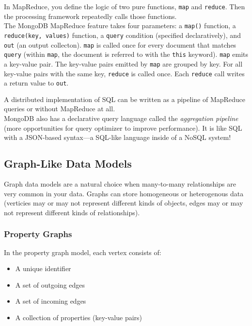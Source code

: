 \documentclass[12pt, titlepage]{article}
\begin{document}
In MapReduce, you define the logic of two pure functions, \texttt{map} and \texttt{reduce}. Then the processing framework repeatedly calls those functions. \\

The MongoDB MapReduce feature takes four parameters: a \texttt{map()} function, a \texttt{reduce(key, values)} function, a \texttt{query} condition (specified declaratively), and \texttt{out} (an output collecton). \texttt{map} is called once for every document that matches \texttt{query} (within \texttt{map}, the document is referred to with the \texttt{this} keyword). \texttt{map} emits a key-value pair. The key-value pairs emitted by \texttt{map} are grouped by key. For all key-value pairs with the same key, \texttt{reduce} is called once. Each \texttt{reduce} call writes a return value to \texttt{out}.

A distributed implementation of SQL can be written as a pipeline of MapReduce queries or without MapReduce at all. \\

MongoDB also has a declarative query language called the \textit{aggregation pipeline} (more opportunities for query optimizer to improve performance). It is like SQL with a JSON-based syntax---a SQL-like language inside of a NoSQL system!

\subsection{Graph-Like Data Models}

Graph data models are a natural choice when many-to-many relationships are very common in your data. Graphs can store homogeneous or heterogenous data (verticies may or may not represent different kinds of objects, edges may or may not represent different kinds of relationships).

\subsubsection{Property Graphs}

In the property graph model, each vertex consists of:

\begin{itemize}
    \item A unique identifier
    \item A set of outgoing edges
    \item A set of incoming edges
    \item A collection of properties (key-value pairs)
\end{itemize}
\end{document}
